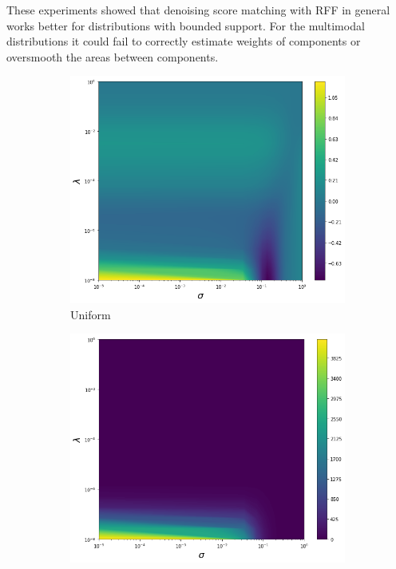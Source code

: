 These experiments showed that denoising score matching with RFF
in general works better for distributions with bounded support.
For the multimodal distributions it could fail to correctly estimate weights of
components or oversmooth the areas between components.
\begin{figure}[!ht]
  \centering
  \begin{subfigure}[b]{0.32\textwidth}
    \includegraphics[width=\textwidth]{figures/score_matching/loss/lossUniform.png}
    \caption{Uniform}
  \end{subfigure}
  \begin{subfigure}[b]{0.32\textwidth}
    \includegraphics[width=\textwidth]{figures/score_matching/loss/lossFunnel.png}

\end{subfigure}
\end{figure}
